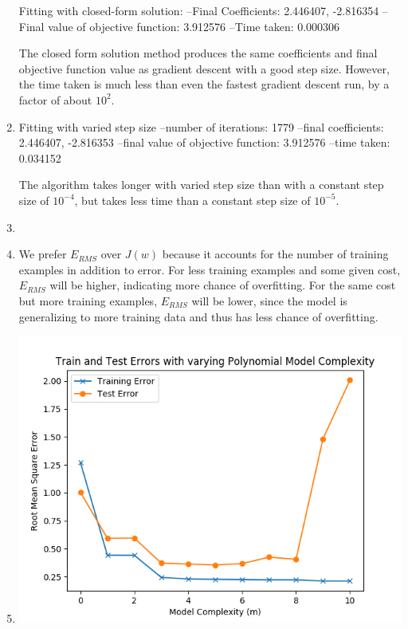 \documentclass[11pt]{article}
\begin{document}
\begin{enumerate}
Fitting with closed-form solution: \newline
	 --Final Coefficients: 2.446407, -2.816354 \newline
	 --Final value of objective function: 3.912576 \newline
	 --Time taken: 0.000306 \newline

The closed form solution method produces the same coefficients and final objective function value as gradient descent with a good step size. However, the time taken is much less than even the fastest gradient descent run, by a factor of about $10^2$.

\item %

Fitting with varied step size \newline
	 --number of iterations: 1779 \newline
	 --final coefficients: 2.446407, -2.816353 \newline
	 --final value of objective function: 3.912576 \newline
	 --time taken: 0.034152 \newline

The algorithm takes longer with varied step size than with a constant step size of $10^{-4}$, but takes less time than a constant step size of $10^{-5}$.

\item %

\item %
We prefer $E_{RMS}$ over $J(w)$ because it accounts for the number of training examples in addition to error. For less training examples and some given cost, $E_{RMS}$ will be higher, indicating more chance of overfitting. For the same cost but more training examples, $E_{RMS}$ will be lower, since the model is generalizing to more training data and thus has less chance of overfitting.

\item %
\includegraphics[width=\linewidth]{Errors.png}


\end{enumerate}
\end{document}
